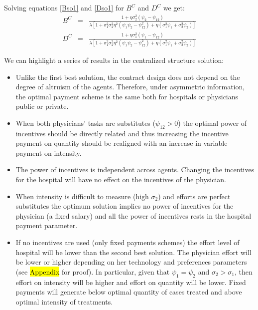 \documentclass[12pt,letterpaper]{article}
\begin{document}
Solving equations \ref{Bso1} and \ref{Dso1} for $B^C$ and $D^C$ we get:
\begin{eqnarray}
B^C&=&\frac{1+\eta\sigma_2^2(\psi_2-\psi_{12})}{\lambda[1+\sigma_1^2\sigma_2^2
\eta^2(\psi_1\psi_2-\psi_{12}^2)+\eta(\sigma_1^2\psi_1+\sigma_2^2\psi_2)]}\label{Bso2}\\
D^C&=&\frac{1+\eta\sigma_1^2(\psi_1-\psi_{12})}{\lambda[1+\sigma_1^2\sigma_2^2
\eta^2(\psi_1\psi_2-\psi_{12}^2)+\eta(\sigma_1^2\psi_1+\sigma_2^2\psi_2)]}\label{Dso2}
\end{eqnarray}

We can highlight a series of results in the centralized structure solution:
\begin{itemize}
  \item Unlike the first best solution, the contract design does not depend on the degree of altruism of the agents. Therefore, under asymmetric information, the optimal payment scheme is the same both for hospitals or physicians public or private.
  \item When both physicians' tasks are substitutes ($\psi_{12}>0$) the optimal power of incentives should be directly related and thus increasing the incentive payment on quantity should be realigned with an increase in variable payment on intensity.
  \item The power of incentives is independent across agents. Changing the incentives for the hospital will have no effect on the incentives of the physician.
  \item When intensity is difficult to measure (high $\sigma_2$) and efforts are perfect substitutes the optimum solution implies no power of incentives for the physician (a fixed salary) and all the power of incentives rests in the hospital payment parameter.
  \item If no incentives are used (only fixed payments schemes) the effort level of hospital will be lower than the second best solution. The physician effort will be lower or higher depending on her technology and preferences parameters (see \hl{Appendix} for proof). In particular, given that $\psi_1=\psi_2$ and $\sigma_2>\sigma_1$, then effort on intensity will be higher and effort on quantity will be lower. Fixed payments will generate below optimal quantity of cases treated and above optimal intensity of treatments.

\end{itemize}
\end{document}
